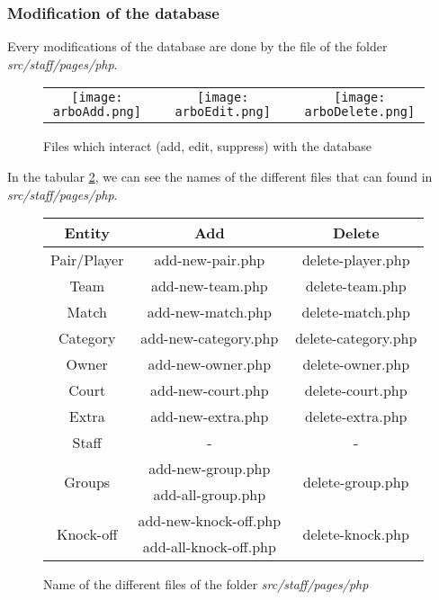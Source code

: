 \documentclass{article}
\begin{document}
\subsubsection{Modification of the database}
Every modifications of the database are done by the file of the folder \textit{src/staff/pages/php}.

\begin{figure}[H]
\centering
    \begin{tabular}{ccccc}
        \texttt{[image: arboAdd.png]}
    &  &
        \texttt{[image: arboEdit.png]}
    &  &
        \texttt{[image: arboDelete.png]}
    \\
    \end{tabular}
\caption{Files which interact (add, edit, suppress) with the database}
\label{fig:maze}
\end{figure}

In the tabular \ref{fig:staffpagesphp}, we can see the names of the different files that can found in \textit{src/staff/pages/php}.
\begin{figure}[H]
\begin{center}
\begin{tabular}{|c|c|c|}
\hline
 Entity &  Add & Delete\\ \hline
 Pair/Player & add-new-pair.php &  delete-player.php \\
 Team & add-new-team.php &  delete-team.php \\
 Match & add-new-match.php &  delete-match.php \\
 Category & add-new-category.php & delete-category.php \\
 Owner & add-new-owner.php &  delete-owner.php \\
 Court & add-new-court.php &  delete-court.php\\
 Extra & add-new-extra.php &  delete-extra.php\\
 Staff & - & - \\
 \multirow{2}{*}{Groups} & add-new-group.php & \multirow{2}{*}{delete-group.php} \\
  & add-all-group.php & \\
 \multirow{2}{*}{Knock-off} & add-new-knock-off.php & \multirow{2}{*}{delete-knock.php} \\
  & add-all-knock-off.php & \\
 \hline
\end{tabular}
\end{center}
 \caption{Name of the different files of the folder \textit{src/staff/pages/php}}
 \label{fig:staffpagesphp}
\end{figure}
\end{document}
